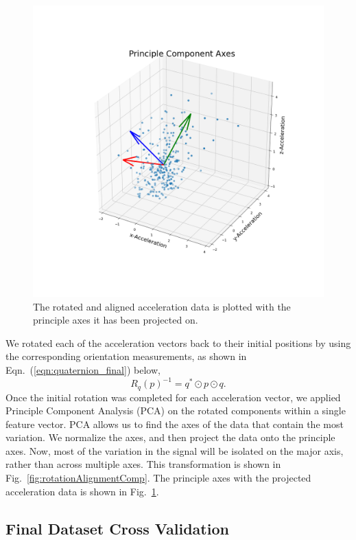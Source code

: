 \begin{figure}[ht]
  \centering
  \includegraphics[width=0.8 \textwidth]{images/comparisons/jog_PrincipleAxes.png}
    \caption{The rotated and aligned acceleration data is plotted with the principle axes it has been projected on.}
     \label{fig:alignedPrincipleAxis}
\end{figure}

We rotated each of the acceleration vectors back to their initial positions by using the corresponding orientation measurements, as shown in Eqn.~(\ref{eqn:quaternion_final}) below,
\begin{equation}
\label{eqn:quaternion_final}
    R_q(p)^{-1} = q^{*} \odot p \odot q.
\end{equation}
Once the initial rotation was completed for each acceleration vector, we applied Principle Component Analysis (PCA) on the rotated components within a single feature vector. PCA allows us to find the axes of the data that contain the most variation. We normalize the axes, and then project the data onto the principle axes. Now, most of the variation in the signal will be isolated on the major axis, rather than across multiple axes. This transformation is shown in Fig.~\ref{fig:rotationAlignmentComp}. The principle axes with the projected acceleration data is shown in Fig.~\ref{fig:alignedPrincipleAxis}.


\subsection{Final Dataset Cross Validation}
\label{sub:actual_results}

